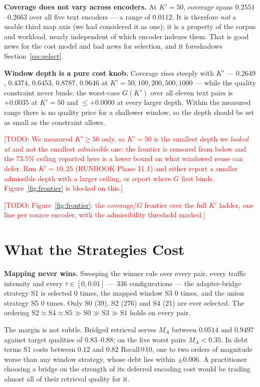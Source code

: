 \documentclass[conference]{IEEEtran}
\newcommand{\todo}[1]{\textcolor{red}{[TODO: #1]}}
\newcommand{\debt}{\mathrm{debt}}
\begin{document}
\textbf{Coverage does not vary across encoders.} At $K' = 50$, coverage spans
$0.2551$--$0.2663$ over all five text encoders --- a range of $0.0112$. It is therefore
\emph{not} a usable third map axis (we had considered it as one); it is a property of the
corpus and workload, nearly independent of which encoder indexes them. That is good news
for the cost model and bad news for selection, and it foreshadows
Section~\ref{sec:select}.

\textbf{Window depth is a pure cost knob.} Coverage rises steeply with $K'$ --- $0.2649$,
$0.4374$, $0.6453$, $0.8787$, $0.9646$ at $K' = 50, 100, 200, 500, 1000$ --- while the
quality constraint never binds: the worst-case $G(K')$ over all eleven text pairs is
$+0.0035$ at $K' = 50$ and $\le +0.0000$ at every larger depth. Within the measured range
there is no quality price for a shallower window, so the depth should be set as small as
the constraint allows.

\todo{We measured $K' \ge 50$ only, so $K' = 50$ is the smallest depth we \emph{looked at}
and not the smallest \emph{admissible} one: the frontier is censored from below and the
$73.5\%$ ceiling reported here is a lower bound on what windowed reuse can defer. Run
$K' = 10, 25$ (RUNBOOK Phase 11.1) and either report a smaller admissible depth with a
larger ceiling, or report where $G$ first binds. Figure~\ref{fig:frontier} is blocked on
this.}

\todo{Figure~\ref{fig:frontier}: the coverage/$G$ frontier over the full $K'$ ladder, one
line per source encoder, with the admissibility threshold marked.}

\section{What the Strategies Cost}\label{sec:cost}

\textbf{Mapping never wins.} Sweeping the winner rule over every pair, every traffic
intensity and every $\tau \in [0, 0.01]$ --- 336 configurations --- the adapter-bridge
strategy S1 is selected $0$ times, the mapped window S3 $0$ times, and the union strategy
S5 $0$ times. Only S0 (39), S2 (276) and S4 (21) are ever selected. The ordering
$\text{S2} \approx \text{S4} \approx \text{S5} \gg \text{S0} \gg \text{S3} \gg \text{S1}$
holds on every pair.

The margin is not subtle. Bridged retrieval serves $M_A$ between $0.0514$ and $0.9497$
against target qualities of $0.83$--$0.88$; on the five worst pairs $M_A < 0.35$. In
$\debt$ terms S1 costs between $0.12$ and $0.82$ Recall@10, one to two orders of
magnitude worse than any window strategy, whose $\debt$ lies within $\pm 0.006$. A
practitioner choosing a bridge on the strength of its deferred encoding cost would be
trading almost all of their retrieval quality for it.
\end{document}
